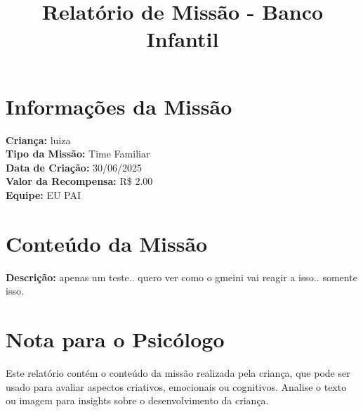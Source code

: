 \documentclass[a4paper,12pt]{article}
\begin{document}
\title{Relatório de Missão - Banco Infantil}
\author{}
\date{}
\maketitle
\section*{Informações da Missão}
\textbf{Criança:} luiza \\
\textbf{Tipo da Missão:} Time Familiar \\
\textbf{Data de Criação:} 30/06/2025 \\
\textbf{Valor da Recompensa:} R\$ 2.00 \\
\textbf{Equipe:} EU PAI \\
\section*{Conteúdo da Missão}
\textbf{Descrição:} apenas um teste.. quero ver como o gmeini vai reagir a isso.. somente isso. \\

\section*{Nota para o Psicólogo}
Este relatório contém o conteúdo da missão realizada pela criança, que pode ser usado para avaliar aspectos criativos, emocionais ou cognitivos. Analise o texto ou imagem para insights sobre o desenvolvimento da criança.
\end{document}
